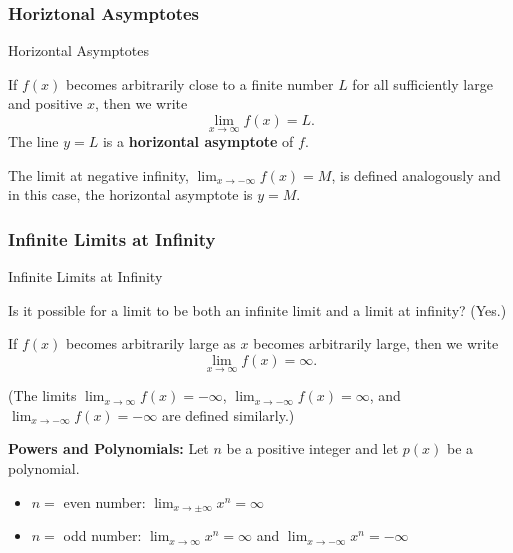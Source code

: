 \documentclass[cal1spr16Lectures.tex]{subfiles}
\begin{document}
\subsubsection{Horiztonal Asymptotes}
\begin{frame}{\small Horizontal Asymptotes}\footnotesize
\begin{dfn} If $f(x)$ becomes arbitrarily close to a finite number $L$ for all sufficiently large and positive $x$, then we write 
\[\lim_{x \to \infty}f(x)=L.\]
The line $y=L$ is a {\bf horizontal asymptote} of $f$. \end{dfn}  
The limit at negative infinity, $\displaystyle\lim_{x \to -\infty}f(x)=M$, is defined analogously and in this case, the horizontal asymptote is $y=M$.
\end{frame}

\subsubsection{Infinite Limits at Infinity}
\begin{frame}{\small Infinite Limits at Infinity}\footnotesize
\begin{que} Is it possible for a limit to be both an infinite limit and a limit at infinity? (Yes.) \end{que}

\vspace{0.5pc}
If $f(x)$ becomes arbitrarily large as $x$ becomes arbitrarily large, then we write 
\[\displaystyle\lim_{x \to \infty}f(x)=\infty.\]  

\vspace{0.5pc}
(The limits 
$\displaystyle\lim_{x \to \infty}f(x)=-\infty$, $\displaystyle\lim_{x \to -\infty}f(x)=\infty$, and $\displaystyle\lim_{x \to -\infty} f(x)=-\infty$ are defined similarly.)
\end{frame}

\begin{frame}{}{}%
{\bf Powers and Polynomials:}  Let $n$ be a positive integer and let $p(x)$ be a polynomial.

\vspace{1pc}
\begin{itemize}
\item $n=$ even number: $\displaystyle\lim_{x\to\pm\infty}x^n=\infty$ 

\vspace{1pc}
\item $n=$ odd number: $\displaystyle\lim_{x \to \infty} x^n = \infty$ and $\displaystyle\lim_{x \to -\infty} x^n = -\infty$
\end{itemize}
\end{frame}
\end{document}
